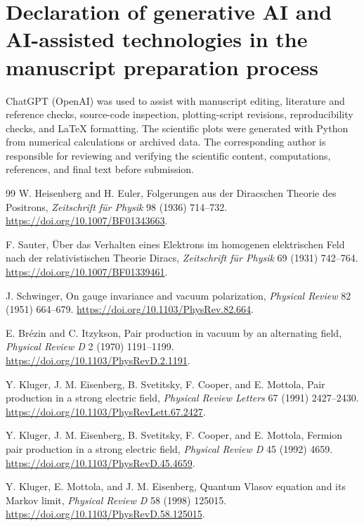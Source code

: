\documentclass[a4paper,fleqn]{cas-dc}
\begin{document}
\section*{Declaration of generative AI and AI-assisted technologies in the manuscript preparation process}
ChatGPT (OpenAI) was used to assist with manuscript editing, literature and reference checks, source-code inspection, plotting-script revisions, reproducibility checks, and LaTeX formatting. The scientific plots were generated with Python from numerical calculations or archived data. The corresponding author is responsible for reviewing and verifying the scientific content, computations, references, and final text before submission.

\FloatBarrier
\begin{thebibliography}{99}
W. Heisenberg and H. Euler, Folgerungen aus der Diracschen Theorie des Positrons, \textit{Zeitschrift f\"ur Physik} 98 (1936) 714--732. \url{https://doi.org/10.1007/BF01343663}.

F. Sauter, \"Uber das Verhalten eines Elektrons im homogenen elektrischen Feld nach der relativistischen Theorie Diracs, \textit{Zeitschrift f\"ur Physik} 69 (1931) 742--764. \url{https://doi.org/10.1007/BF01339461}.

J. Schwinger, On gauge invariance and vacuum polarization, \textit{Physical Review} 82 (1951) 664--679. \url{https://doi.org/10.1103/PhysRev.82.664}.

E. Br\'ezin and C. Itzykson, Pair production in vacuum by an alternating field, \textit{Physical Review D} 2 (1970) 1191--1199. \url{https://doi.org/10.1103/PhysRevD.2.1191}.

Y. Kluger, J. M. Eisenberg, B. Svetitsky, F. Cooper, and E. Mottola, Pair production in a strong electric field, \textit{Physical Review Letters} 67 (1991) 2427--2430. \url{https://doi.org/10.1103/PhysRevLett.67.2427}.

Y. Kluger, J. M. Eisenberg, B. Svetitsky, F. Cooper, and E. Mottola, Fermion pair production in a strong electric field, \textit{Physical Review D} 45 (1992) 4659. \url{https://doi.org/10.1103/PhysRevD.45.4659}.

Y. Kluger, E. Mottola, and J. M. Eisenberg, Quantum Vlasov equation and its Markov limit, \textit{Physical Review D} 58 (1998) 125015. \url{https://doi.org/10.1103/PhysRevD.58.125015}.


\end{thebibliography}
\end{document}
